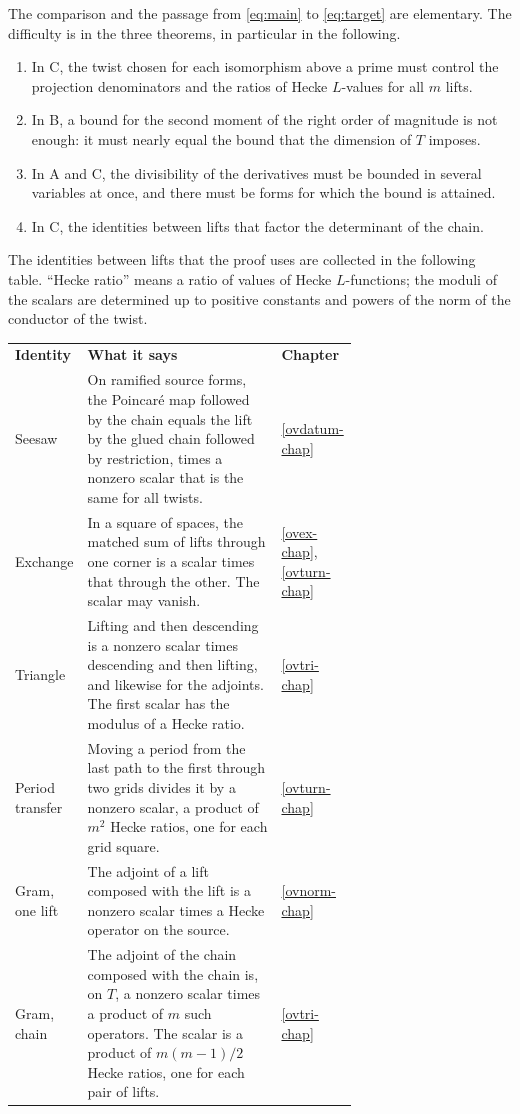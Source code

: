 \documentclass[reqno]{amsart}
\newcounter{chap}
\theoremstyle{definition}
\begin{document}
The comparison and the passage from \eqref{eq:main} to
\eqref{eq:target} are elementary.  The difficulty is in the three
theorems, in particular in the following.
\begin{enumerate}
\item In C, the twist chosen for each isomorphism above a prime must
  control the projection denominators and the ratios of Hecke
  \(L\)-values for all \(m\) lifts.
\item In B, a bound for the second moment of the right order of
  magnitude is not enough: it must nearly equal the bound that the
  dimension of \(T\) imposes.
\item In A and C, the divisibility of the derivatives must be
  bounded in several variables at once, and there must be forms
  for which the bound is attained.
\item In C, the identities between lifts that factor the
  determinant of the chain.
\end{enumerate}

The identities between lifts that the proof uses are collected in
the following table.  ``Hecke ratio'' means a ratio of values of Hecke
\(L\)-functions; the moduli of the scalars are determined up to
positive constants and powers of the norm of the conductor of the
twist.

\begin{center}
\small
\setlength{\tabcolsep}{4pt}
\begin{tabular}{@{}l p{0.68\linewidth} l@{}}
  \textbf{Identity} & \textbf{What it says} & \textbf{Chapter} \\
  Seesaw & On ramified source forms, the Poincar\'e map followed by the
  chain equals the lift by the glued chain followed by restriction, times
  a nonzero scalar that is the same for all twists.
  & \ref{ovdatum-chap} \\
  Exchange & In a square of spaces, the matched sum of lifts through one
  corner is a scalar times that through the other.  The scalar may vanish.
  & \ref{ovex-chap}, \ref{ovturn-chap} \\
  Triangle & Lifting and then descending is a nonzero scalar times
  descending and then lifting, and likewise for the adjoints.  The first
  scalar has the modulus of a Hecke ratio.
  & \ref{ovtri-chap} \\
  Period transfer & Moving a period from the last path to the first
  through two grids divides it by a nonzero scalar, a product of \(m^2\)
  Hecke ratios, one for each grid square.
  & \ref{ovturn-chap} \\
  Gram, one lift & The adjoint of a lift composed with the lift is a nonzero
  scalar times a Hecke operator on the source.
  & \ref{ovnorm-chap} \\
  Gram, chain & The adjoint of the chain composed with the chain is, on
  \(T\), a nonzero scalar times a product of \(m\) such operators.  The
  scalar is a product of \(m(m-1)/2\) Hecke ratios, one for each pair of lifts.
  & \ref{ovtri-chap}
\end{tabular}
\end{center}
\end{document}
